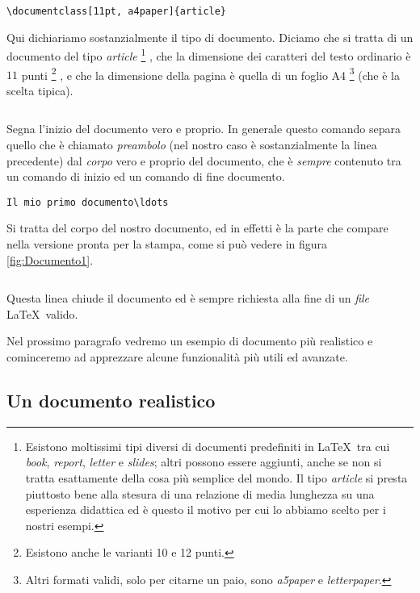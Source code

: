 \begin{verbatim}
\documentclass[11pt, a4paper]{article}
\end{verbatim}
Qui dichiariamo sostanzialmente il tipo di documento. Diciamo che si tratta di
un documento del tipo \emph{article}%
\footnote{
Esistono moltissimi tipi diversi di documenti predefiniti in \LaTeX\, tra cui
\emph{book}, \emph{report}, \emph{letter} e \emph{slides}; altri possono essere
aggiunti, anche se non si tratta esattamente della cosa pi\`u semplice del
mondo. Il tipo \emph{article} si presta piuttosto bene alla stesura di una
relazione di media lunghezza su una esperienza didattica ed \`e questo il
motivo per cui lo abbiamo scelto per i nostri esempi.
}%
, che la dimensione dei caratteri del testo ordinario \`e $11$ punti%
\footnote{
Esistono anche le varianti 10 e 12 punti.
}%
, e che la dimensione della pagina \`e quella di un foglio A4%
\footnote{
Altri formati validi, solo per citarne un paio, sono \emph{a5paper}
e \emph{letterpaper}.
}
(che \`e la scelta tipica).

\begin{verbatim}

\end{verbatim}
Segna l'inizio del documento vero e proprio. In generale questo comando separa
quello che \`e chiamato \emph{preambolo} (nel nostro caso \`e sostanzialmente
la linea precedente) dal \emph{corpo} vero e proprio del documento, che \`e
\emph{sempre} contenuto tra un comando di inizio ed un comando di fine
documento.

\begin{verbatim}
Il mio primo documento\ldots
\end{verbatim}
Si tratta del corpo del nostro documento, ed in effetti \`e la parte che
compare nella versione pronta per la stampa, come si pu\`o vedere in figura
\ref{fig:Documento1}.

\begin{verbatim}

\end{verbatim}
Questa linea chiude il documento ed \`e sempre richiesta alla fine di un
\emph{file} \LaTeX\ valido.

Nel prossimo paragrafo vedremo un esempio di documento pi\`u realistico e
cominceremo ad apprezzare alcune funzionalit\`a pi\`u utili ed avanzate.


\subsection{Un documento realistico}
\label{sec:Documento2}

